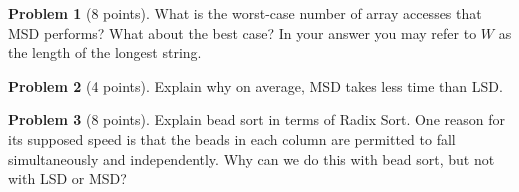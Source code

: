 \documentclass{exam}
\theoremstyle{definition}
\newtheorem{problem}{Problem}[section]
\theoremstyle{definition}
\begin{document}
\begin{problem}[8 points]
    What is the worst-case number of array accesses that MSD performs? What about the best case? In your answer you may refer to $W$ as the length of the longest string. 
\end{problem}

\begin{problem}[4 points]
    Explain why on average, MSD takes less time than LSD.
\end{problem}

\begin{problem}[8 points]
    Explain bead sort in terms of Radix Sort. One reason for its supposed speed is that the beads in each column are permitted to fall simultaneously and independently. Why can we do this with bead sort, but not with LSD or MSD?
\end{problem}
\end{document}
